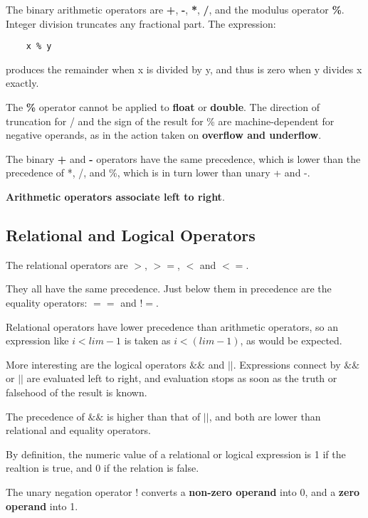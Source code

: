 \documentclass{article}
\begin{document}
The binary arithmetic operators are \textbf{+}, \textbf{-}, \textbf{*}, \textbf{/}, and the modulus operator \textbf{\%}. Integer division truncates any fractional part. The expression:

\begin{lstlisting}
	x % y
\end{lstlisting}

produces the remainder when x is divided by y, and thus is zero when y divides x exactly.

The \textbf{\%} operator cannot be applied to \textbf{float} or \textbf{double}. The direction of truncation for / and the sign of the result for \% are machine-dependent for negative operands, as in the action taken on \textbf{overflow and underflow}.

The binary \textbf{+} and \textbf{-} operators have the same precedence, which is lower than the precedence of *, /, and \%, which is in turn lower than unary + and -.

\textbf{Arithmetic operators associate left to right}.

\clearpage
\subsection{Relational and Logical Operators}

The relational operators are \textbf{$>$}, \textbf{$>=$}, \textbf{$<$} and \textbf{$<=$}.

They all have the same precedence. Just below them in precedence are the equality operators: \textbf{$==$} and \textbf{$!=$}.

Relational operators have lower precedence than arithmetic operators, so an expression like \textbf{$i < lim-1$} is taken as \textbf{$i < (lim-1)$}, as would be expected.

More interesting are the logical operators \textbf{$\&\&$} and \textbf{$||$}. Expressions connect by $\&\&$ or $||$ are evaluated left to right, and evaluation stops as soon as the truth or falsehood of the result is known. 

The precedence of $\&\&$ is higher than that of $||$, and both are lower than relational and equality operators.

By definition, the numeric value of a relational or logical expression is 1 if the realtion is true, and 0 if the relation is false. 

The unary negation operator ! converts a \textbf{non-zero operand} into 0, and a \textbf{zero operand} into 1.
\end{document}
